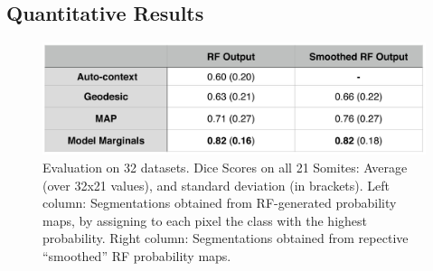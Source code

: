 \documentclass[10pt,twocolumn,letterpaper]{article}
\begin{document}
\subsection{Quantitative Results}
%
\begin{figure}[t]
\begin{center}
\includegraphics[width=\columnwidth]{TableDiceScores_2columns_noGeoF2.jpg} %
\caption{Evaluation on 32 datasets. Dice Scores on all 21 Somites: Average (over 32x21 values), and standard deviation (in brackets). Left column: Segmentations obtained from RF-generated probability maps, by assigning to each pixel the class with the highest probability. Right column: Segmentations obtained from repective ``smoothed'' RF probability maps.}
\label{fig:results}
\end{center}
\end{figure}
\end{document}
